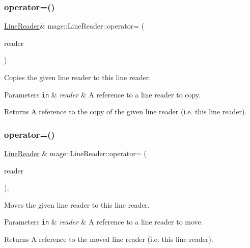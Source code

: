 \subsubsection{\texorpdfstring{operator=()}{operator=()}\hspace{0.1cm}{\footnotesize\ttfamily [1/2]}}
{\footnotesize\ttfamily \mbox{\hyperlink{classmage_1_1_line_reader}{Line\+Reader}}\& mage\+::\+Line\+Reader\+::operator= (\begin{DoxyParamCaption}\item[{const \mbox{\hyperlink{classmage_1_1_line_reader}{Line\+Reader}} \&}]{reader }\end{DoxyParamCaption})\hspace{0.3cm}{\ttfamily [delete]}}

Copies the given line reader to this line reader.


\begin{DoxyParams}[1]{Parameters}
\mbox{\tt in}  & {\em reader} & A reference to a line reader to copy. \\
\hline
\end{DoxyParams}
\begin{DoxyReturn}{Returns}
A reference to the copy of the given line reader (i.\+e. this line reader). 
\end{DoxyReturn}
\mbox{\label{classmage_1_1_line_reader_a3ba691cb32a1ab5dcbe75498068c1b86}} 
\subsubsection{\texorpdfstring{operator=()}{operator=()}\hspace{0.1cm}{\footnotesize\ttfamily [2/2]}}
{\footnotesize\ttfamily \mbox{\hyperlink{classmage_1_1_line_reader}{Line\+Reader}} \& mage\+::\+Line\+Reader\+::operator= (\begin{DoxyParamCaption}\item[{\mbox{\hyperlink{classmage_1_1_line_reader}{Line\+Reader}} \&\&}]{reader }\end{DoxyParamCaption})\hspace{0.3cm}{\ttfamily [default]}, {\ttfamily [noexcept]}}

Moves the given line reader to this line reader.


\begin{DoxyParams}[1]{Parameters}
\mbox{\tt in}  & {\em reader} & A reference to a line reader to move. \\
\hline
\end{DoxyParams}
\begin{DoxyReturn}{Returns}
A reference to the moved line reader (i.\+e. this line reader). 
\end{DoxyReturn}
\mbox{\label{classmage_1_1_line_reader_adfde21013140a1058d3dd567204abfb5}} 
